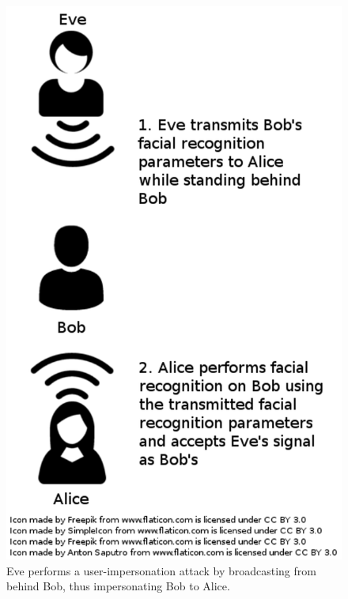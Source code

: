 \documentclass[12pt]{report}
\begin{document}
\begin{figure}[!htb]
    \begin{center}
        \caption{Eve performs a user-impersonation attack by broadcasting from behind Bob, thus impersonating Bob to Alice.}
        \label{figure: user-impersonation}
        \centerline{\includegraphics[scale=0.075]{../images/user-impersonation-attack.png}}
    \end{center}
\end{figure}
\end{document}
